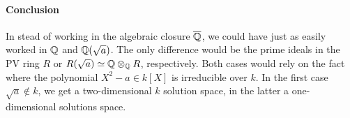 \paragraph{Conclusion}
In stead of working in the algebraic closure $\overline{\mathbb{Q}}$, we could have just as easily worked in $\mathbb{Q}$ and $\mathbb{Q}(\sqrt{a})$. The only difference would be the prime ideals in the PV ring $R$ or $R(\sqrt{a}) \simeq \mathbb{Q} \otimes_{\mathbb{Q}} R$, respectively. Both cases would rely on the fact where the polynomial $X^2 - a \in k[X]$ is irreducible over $k$. In the first case $\sqrt{a} \notin k$, we get a two-dimensional $k$ solution space, in the latter a one-dimensional solutions space.